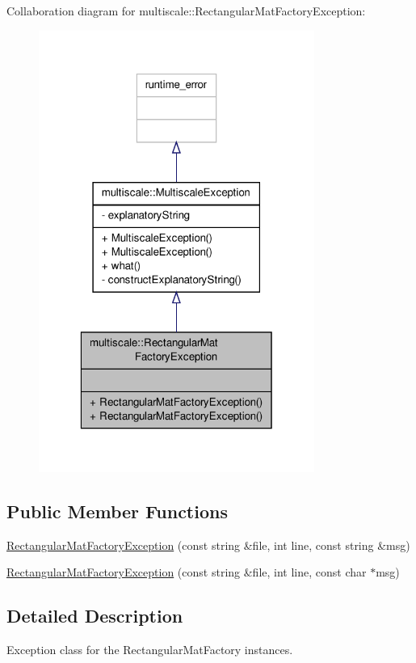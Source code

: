 Collaboration diagram for multiscale\-:\-:Rectangular\-Mat\-Factory\-Exception\-:
\nopagebreak
\begin{figure}[H]
\begin{center}
\leavevmode
\includegraphics[width=256pt]{classmultiscale_1_1RectangularMatFactoryException__coll__graph}
\end{center}
\end{figure}
\subsection*{Public Member Functions}
\begin{DoxyCompactItemize}
\item 
\hyperlink{classmultiscale_1_1RectangularMatFactoryException_a08ba7e88c5b1af7df82e4c376287bedf}{Rectangular\-Mat\-Factory\-Exception} (const string \&file, int line, const string \&msg)
\item 
\hyperlink{classmultiscale_1_1RectangularMatFactoryException_aca0beb9e5c613533ddafff4118ddf2d0}{Rectangular\-Mat\-Factory\-Exception} (const string \&file, int line, const char $\ast$msg)
\end{DoxyCompactItemize}


\subsection{Detailed Description}
Exception class for the Rectangular\-Mat\-Factory instances. 

